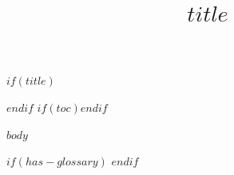\documentclass[11pt]{article}
\title{$title$}
\theoremstyle{plain}
\theoremstyle{definition}
\theoremstyle{remark}
\begin{document}
$if(title)$\maketitle$endif$
$if(toc)$\tableofcontents\newpage$endif$

$body$

$if(has-glossary)$
\clearpage
\printglossary[type=\acronymtype, title={Acronyms}]
\printglossary[title={Glossary}]
$endif$
\end{document}
